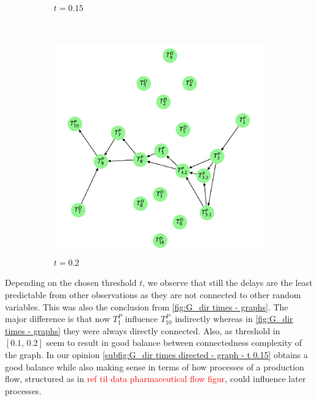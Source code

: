 \documentclass[../Thesis.tex]{subfiles}
\begin{document}
\begin{figure}[ht]
\begin{subfigure}[t]{0.43\linewidth}
        \caption{$t = 0.15$}
        \label{subfig:G_dir times directed - graph - t 0.15}
    \end{subfigure}
    \\[\baselineskip]
    \begin{subfigure}[t]{0.43\linewidth}
        \includegraphics[width = \linewidth]{figures/Cycle data/G_dir times as graph - directed - 0_2.pdf}
        \caption{$t=0.2$}
        \label{subfig:G_dir times directed - graph - t 0.2}
    \end{subfigure}
    \caption{}
    \label{fig:G_dir times directed - graphs}
\end{figure}

Depending on the chosen threshold $t$, we observe that still the delays are the least predictable from other observations as they are not connected to other random variables. This was also the conclusion from \autoref{fig:G_dir times - graphs}. The major difference is that now $T^P_1$ influence $T^P_{10}$ indirectly whereas in \autoref{fig:G_dir times - graphs} they were always directly connected. Also, as threshold in $[0.1,\, 0.2]$ seem to result in good balance between connectedness complexity of the graph. In our opinion \autoref{subfig:G_dir times directed - graph - t 0.15} obtains a good balance while also making sense in terms of how processes of a production flow, structured as in \textcolor{red}{ref til data pharmaceutical flow figur}, could influence later processes.
\end{document}
